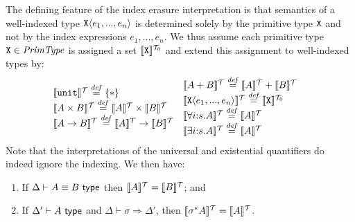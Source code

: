 The defining feature of the index erasure interpretation is that 
semantics of a well-indexed type $\textup{\texttt{X}}\langle e_1,...,e_n \rangle$ is
determined solely by the primitive type $\textup{\texttt{X}}$ and not by the
index expressions $e_1,...,e_n$. %
We thus assume each
primitive type $\textup{\texttt{X}} \in \mathit{PrimType}$ is assigned a set
$\llbracket \textup{\texttt{X}} \rrbracket^{\mathcal{T}_0}$ and %
extend this assignment to %
well-indexed types by: %
\begin{displaymath}
  \begin{array}{@{\hspace{0em}}c@{\hspace{0em}}c}
    \begin{array}{@{}l}
      \tySem{\tyUnit} \isDefinedAs \{*\} \\
      \tySem{A \tyProduct B} \isDefinedAs \tySem{A} \times \tySem{B} \\
      \tySem{A \tyArr B} \isDefinedAs \tySem{A} \to \tySem{B} \\
    \end{array}
    &
    \begin{array}{l}
      \tySem{A + B} \isDefinedAs \tySem{A} + \tySem{B} \\
      \tySem{\tyPrim{X}{e_1,...,e_n}} \isDefinedAs \tyPrimSem{\tyPrimNm{X}} \\
      \tySem{\forall i\mathord:s. A} \isDefinedAs \tySem{A} \\
      \tySem{\exists i\mathord:s. A} \isDefinedAs \tySem{A}
    \end{array}
  \end{array}
\end{displaymath}
Note that 
the interpretations of the
universal and existential quantifiers 
do indeed
ignore the indexing. %
We then have:

\begin{lemma}\label{lem:tyeqsubst-erasure}
  \begin{enumerate}
  \item If $\Delta \vdash A \equiv B \textsf{ type}$ then $\llbracket A \rrbracket^{\mathcal{T}} =
    \llbracket B \rrbracket^{\mathcal{T}}$; and
  \item If $\Delta' \vdash A \textsf{ type}$ and $\Delta \vdash \sigma
    \Rightarrow \Delta'$, then $\llbracket \sigma^*A \rrbracket^{\mathcal{T}} = \llbracket A \rrbracket^{\mathcal{T}}$.
  \end{enumerate}
\end{lemma}


